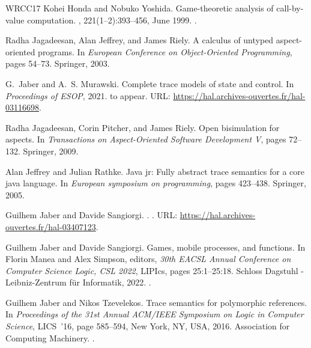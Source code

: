 \documentclass[11pt,a4paper]{amsart}
\theoremstyle{plain}
\theoremstyle{definition}
\theoremstyle{defC}
\theoremstyle{thmC}
\theoremstyle{plain}
\numberwithin{equation}{section}
\theoremstyle{plain}
\theoremstyle{definition}
\begin{document}
\begin{thebibliography}{WRCC17}
Kohei Honda and Nobuko Yoshida.
\newblock Game-theoretic analysis of call-by-value computation.
, 221(1–2):393–456, June 1999.
\newblock \href {https://doi.org/10.1016/S0304-3975(99)00039-0}
  {}.

Radha Jagadeesan, Alan Jeffrey, and James Riely.
\newblock A calculus of untyped aspect-oriented programs.
\newblock In {\em European Conference on Object-Oriented Programming}, pages
  54--73. Springer, 2003.

G.~Jaber and A.~S. Murawski.
\newblock Complete trace models of state and control.
\newblock In {\em Proceedings of ESOP}, 2021.
\newblock to appear.
\newblock URL: \url{https://hal.archives-ouvertes.fr/hal-03116698}.

Radha Jagadeesan, Corin Pitcher, and James Riely.
\newblock Open bisimulation for aspects.
\newblock In {\em Transactions on Aspect-Oriented Software Development V},
  pages 72--132. Springer, 2009.

Alan Jeffrey and Julian Rathke.
\newblock Java jr: Fully abstract trace semantics for a core java language.
\newblock In {\em European symposium on programming}, pages 423--438. Springer,
  2005.

Guilhem Jaber and Davide Sangiorgi.
.
.
\newblock URL: \url{https://hal.archives-ouvertes.fr/hal-03407123}.

Guilhem Jaber and Davide Sangiorgi.
\newblock Games, mobile processes, and functions.
\newblock In Florin Manea and Alex Simpson, editors, {\em 30th {EACSL} Annual
  Conference on Computer Science Logic, {CSL} 2022}, LIPIcs, pages 25:1--25:18.
  Schloss Dagstuhl - Leibniz-Zentrum f{\"{u}}r Informatik, 2022.
\newblock \href {https://doi.org/10.4230/LIPICS.CSL.2022.25}
  {}.

Guilhem Jaber and Nikos Tzevelekos.
\newblock Trace semantics for polymorphic references.
\newblock In {\em Proceedings of the 31st Annual ACM/IEEE Symposium on Logic in
  Computer Science}, LICS~'16, page 585–594, New York, NY, USA, 2016.
  Association for Computing Machinery.
\newblock \href {https://doi.org/10.1145/2933575.2934509}
  {}.


\end{thebibliography}
\end{document}
